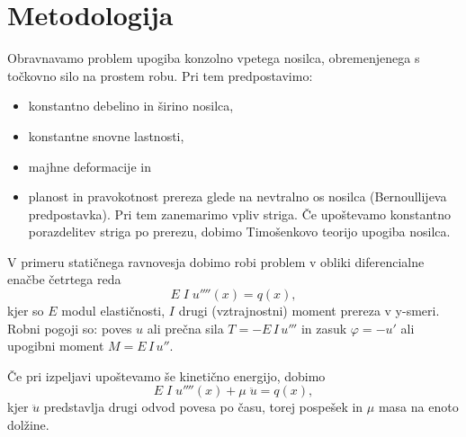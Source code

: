 \section{Metodologija}

Obravnavamo problem upogiba konzolno vpetega nosilca, obremenjenega s točkovno silo na prostem robu. Pri tem predpostavimo:
\begin{itemize}
    \item konstantno debelino in širino nosilca,
    \item konstantne snovne lastnosti,
    \item majhne deformacije in 
    \item planost in pravokotnost prereza glede na nevtralno os nosilca (Bernoullijeva predpostavka). Pri tem zanemarimo vpliv striga. Če upoštevamo konstantno porazdelitev striga po prerezu, dobimo Timošenkovo teorijo upogiba nosilca.
\end{itemize}


V primeru statičnega ravnovesja dobimo robi problem v obliki diferencialne enačbe četrtega reda
\begin{equation}
    E\;I\;u''''(x) = q(x),
\end{equation} 
kjer so $E$ modul elastičnosti, $I$ drugi (vztrajnostni) moment prereza v y-smeri. Robni pogoji so: poves $u$ ali prečna sila $T=-E\,I\,u'''$ in zasuk $\varphi=-u'$ ali upogibni moment $M=E\,I\,u''$.

Če pri izpeljavi upoštevamo še kinetično energijo, dobimo 
\begin{equation}
    E\;I\;u''''(x) + \mu\;\ddot{u} = q(x),
\end{equation}
kjer $\ddot{u}$ predstavlja drugi odvod povesa po času, torej pospešek in $\mu$ masa na enoto dolžine.

